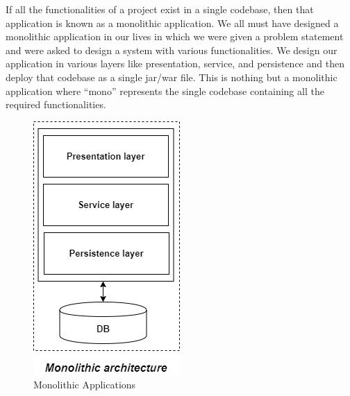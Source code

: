 If all the functionalities of a project exist in a single codebase, then that application is known as a monolithic application. We all must have designed a monolithic application in our lives in which we were given a problem statement and were asked to design a system with various functionalities. We design our application in various layers like presentation, service, and persistence and then deploy that codebase as a single jar/war file. This is nothing but a monolithic application where “mono” represents the single codebase containing all the required functionalities.
\begin{figure}[!ht]
      \center
      \includegraphics[scale=0.50]{assets/monolithic.jpg}
      \caption{Monolithic Applications}
      \label{fig:monoapp}
\end{figure}

